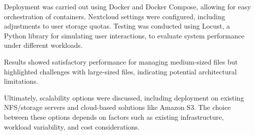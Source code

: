 \documentclass{article}
\begin{document}
	Deployment was carried out using Docker and Docker Compose, allowing for easy orchestration of containers. Nextcloud settings were configured, including adjustments to user storage quotas. Testing was conducted using Locust, a Python library for simulating user interactions, to evaluate system performance under different workloads.
	
	Results showed satisfactory performance for managing medium-sized files but highlighted challenges with large-sized files, indicating potential architectural limitations. 
	
	Ultimately, scalability options were discussed, including deployment on existing NFS/storage servers and cloud-based solutions like Amazon S3. The choice between these options depends on factors such as existing infrastructure, workload variability, and cost considerations.
	
	
	
	
\end{document}
